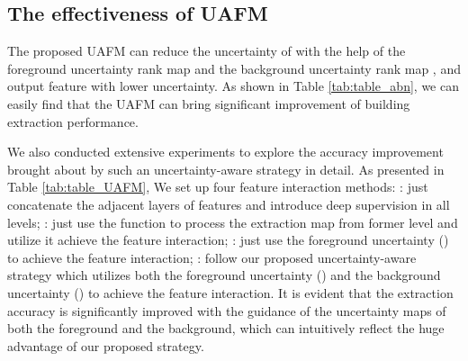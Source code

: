 \documentclass[lettersize,journal]{IEEEtran}
\begin{document}
\subsection{The effectiveness of UAFM}

The proposed UAFM can reduce the uncertainty of  with the help of
the foreground uncertainty rank map  and the background uncertainty rank map , and output feature  with lower uncertainty. As shown in Table \ref{tab:table_abn}, we can easily find that the UAFM can bring significant improvement of building extraction performance.
\par




We also conducted extensive experiments to explore the accuracy improvement brought about by such an uncertainty-aware strategy in detail. As presented in Table \ref{tab:table_UAFM}, We set up four feature interaction methods: \textbf{}: just concatenate the adjacent layers of features and introduce deep supervision in all levels; \textbf{}: just use the  function to process the extraction map from former level and utilize it achieve the feature interaction; \textbf{}: just use the foreground uncertainty () to achieve the feature interaction; \textbf{}: follow our proposed uncertainty-aware strategy which utilizes both the foreground uncertainty () and the background uncertainty () to achieve the feature interaction. 
It is evident that the extraction accuracy is significantly improved with the guidance of the uncertainty maps of both the foreground and the background, which can intuitively reflect the huge advantage of our proposed strategy.
\end{document}
